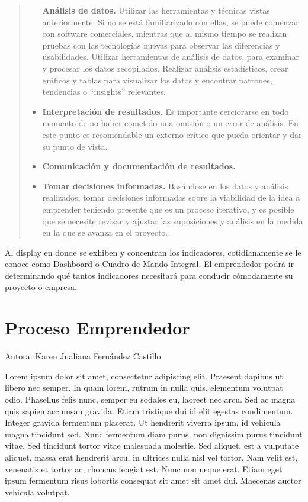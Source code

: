 \documentclass[
  letterpaper,
  DIV=11,
  numbers=noendperiod]{scrreprt}
\begin{document}
\begin{quote}
\begin{itemize}
  \textbf{Análisis de datos.} Utilizar las herramientas y técnicas
  vistas anteriormente. Si no se está familiarizado con ellas, se puede
  comenzar con software comerciales, mientras que al mismo tiempo se
  realizan pruebas con las tecnologías nuevas para observar las
  diferencias y usabilidades. Utilizar herramientas de análisis de
  datos, para examinar y procesar los datos recopilados. Realizar
  análisis estadísticos, crear gráficos y tablas para visualizar los
  datos y encontrar patrones, tendencias o ``insights'' relevantes.
\item
  \textbf{Interpretación de resultados.} Es importante cerciorarse en
  todo momento de no haber cometido una omisión o un error de análisis.
  En este punto es recomendable un externo crítico que pueda orientar y
  dar su punto de vista.
\item
  \textbf{Comunicación y documentación de resultados.}
\item
  \textbf{Tomar decisiones informadas.} Basándose en los datos y
  análisis realizados, tomar decisiones informadas sobre la viabilidad
  de la idea a emprender teniendo presente que es un proceso iterativo,
  y es posible que se necesite revisar y ajustar las suposiciones y
  análisis en la medida en la que se avanza en el proyecto.
\end{itemize}
\end{quote}

Al display en donde se exhiben y concentran los indicadores,
cotidianamente se le conoce como Dashboard o Cuadro de Mando Integral.
El emprendedor podrá ir determinando qué tantos indicadores necesitará
para conducir cómodamente su proyecto o empresa.


\hypertarget{proceso-emprendedor}{%
\chapter{Proceso Emprendedor}\label{proceso-emprendedor}}

Autora: Karen Jualiana Fernández Castillo

Lorem ipsum dolor sit amet, consectetur adipiscing elit. Praesent
dapibus ut libero nec semper. In quam lorem, rutrum in nulla quis,
elementum volutpat odio. Phasellus felis nunc, semper eu sodales eu,
laoreet nec arcu. Sed ac magna quis sapien accumsan gravida. Etiam
tristique dui id elit egestas condimentum. Integer gravida fermentum
placerat. Ut hendrerit viverra ipsum, id vehicula magna tincidunt sed.
Nunc fermentum diam purus, non dignissim purus tincidunt vitae. Sed
tincidunt tortor vitae malesuada molestie. Sed aliquet, est a vulputate
aliquet, massa erat hendrerit arcu, in ultrices nulla nisl vel tortor.
Nam velit est, venenatis et tortor ac, rhoncus feugiat est. Nunc non
neque erat. Etiam eget ipsum fermentum risus lobortis consequat sit amet
sit amet dui. Maecenas auctor vehicula volutpat.
\end{document}
